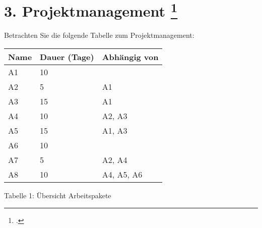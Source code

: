 \documentclass{lehramt-informatik-aufgabe}
\begin{document}

\section{3. Projektmanagement
\footcite[Thema 1 Teilaufgabe 1 Aufgabe 3]{examen:46116:2015:09}}

Betrachten Sie die folgende Tabelle zum Projektmanagement:

\begin{center}
\begin{tabular}{|l|l|l|}
\hline
Name & Dauer (Tage) & Abhängig von\\\hline\hline
A1 & 10 & \\\hline
A2 & 5  & A1 \\\hline
A3 & 15 & A1 \\\hline
A4 & 10 & A2, A3 \\\hline
A5 & 15 & A1, A3 \\\hline
A6 & 10 & \\\hline
A7 & 5  & A2, A4 \\\hline
A8 & 10 & A4, A5, A6 \\\hline
\end{tabular}
\end{center}

Tabelle 1: Übersicht Arbeitspakete
\end{document}
